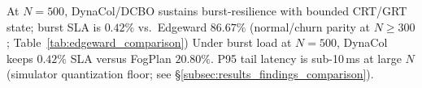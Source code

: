 At $N=500$, DynaCol/DCBO sustains burst-resilience with bounded CRT/GRT state; burst SLA is $0.42\%$ vs.\ Edgeward $86.67\%$ (normal/churn parity at $N\geq300$; Table~\ref{tab:edgeward_comparison}) Under burst load at $N=500$, DynaCol keeps $0.42\%$ SLA versus FogPlan $20.80\%$. P95 tail latency is sub-10\,ms at large $N$ (simulator quantization floor; see \S\ref{subsec:results_findings_comparison}).